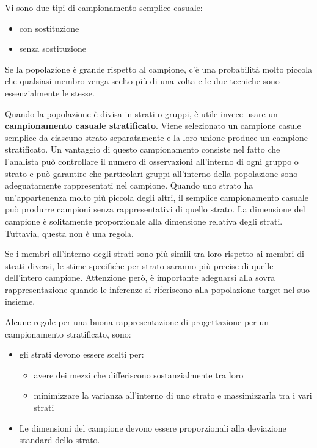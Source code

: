 \documentclass[a4paper]{extarticle}
\begin{document}
Vi sono due tipi di campionamento semplice casuale:
\begin{itemize}
\item con sostituzione
\item senza sostituzione
\end{itemize}

Se la popolazione è grande rispetto al campione, c'è una probabilità molto piccola che qualsiasi membro venga scelto più di una volta e le due tecniche sono essenzialmente le stesse.

Quando la popolazione è divisa in strati o gruppi, è utile invece usare un \textbf{campionamento casuale stratificato}. Viene selezionato un campione casule semplice da ciascuno strato separatamente e la loro unione produce un campione stratificato. Un vantaggio di questo campionamento consiste nel fatto che l'analista può controllare il numero di osservazioni all'interno di ogni gruppo o strato e può garantire che particolari gruppi all'interno della popolazione sono adeguatamente rappresentati nel campione. Quando uno strato ha un'appartenenza molto più piccola degli altri, il semplice campionamento casuale può produrre campioni senza rappresentativi di quello strato. La dimensione del campione è solitamente proporzionale alla dimensione relativa degli strati. Tuttavia, questa non è una regola.

Se i membri all'interno degli strati sono più simili tra loro rispetto ai membri di strati diversi, le stime specifiche per strato saranno più precise di quelle dell'intero campione. Attenzione però, è importante adeguarsi alla sovra rappresentazione quando le inferenze si riferiscono alla popolazione target nel suo insieme.

Alcune regole per una buona rappresentazione di progettazione per un campionamento stratificato, sono:
\begin{itemize}
\item gli strati devono essere scelti per:
\begin{itemize}
\item avere dei mezzi che differiscono sostanzialmente tra loro
\item minimizzare la varianza all'interno di uno strato e massimizzarla tra i vari strati
\end{itemize}
\item Le dimensioni del campione devono essere proporzionali alla deviazione standard dello strato.
\end{itemize}
\end{document}

